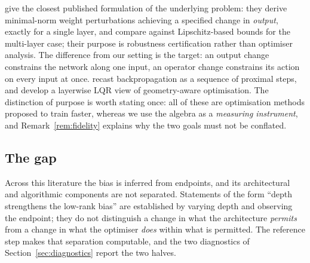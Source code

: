 \documentclass{article} %
\theoremstyle{plain}
\theoremstyle{definition}
\theoremstyle{remark}
\begin{document}
\citet{evans2026theory} give the closest published formulation of the underlying problem: they
derive minimal-norm weight perturbations achieving a specified change in \emph{output}, exactly for
a single layer, and compare against Lipschitz-based bounds for the multi-layer case; their purpose
is robustness certification rather than optimiser analysis. The difference from our setting is the
target: an output change constrains the network along one input, an operator change constrains its
action on every input at once. \citet{frerix2018proximal} recast
backpropagation as a sequence of proximal steps, and \citet{dufortlabbe2026layerwise} develop a
layerwise LQR view of geometry-aware optimisation. The distinction of purpose is worth stating
once: all of these are optimisation methods proposed to train faster, whereas we use the algebra as
a \emph{measuring instrument}, and Remark~\ref{rem:fidelity} explains why the two goals must not be
conflated.

\subsection{The gap}

Across this literature the bias is inferred from endpoints, and its architectural and algorithmic
components are not separated. Statements of the form ``depth strengthens the low-rank bias'' are
established by varying depth and observing the endpoint; they do not distinguish a change in what
the architecture \emph{permits} from a change in what the optimiser \emph{does} within what is
permitted. The reference step makes that separation computable, and the two diagnostics of
Section~\ref{sec:diagnostics} report the two halves.
\end{document}
